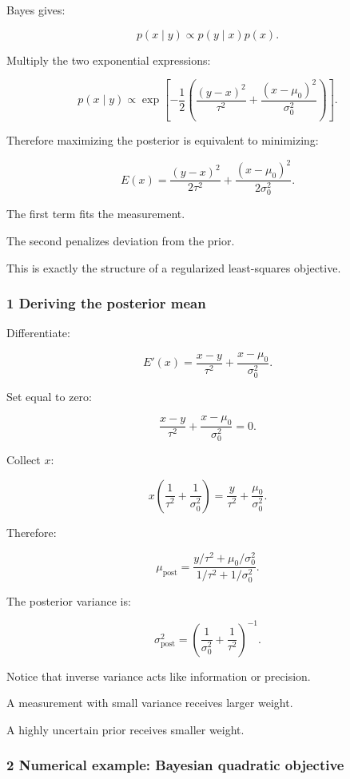 Bayes gives:

\[
 p(x\mid y)\propto p(y\mid x)p(x).
\]

Multiply the two exponential expressions:

\[
 p(x\mid y) \propto \exp\left[ -\frac12 \left( \frac{(y-x)^2}{\tau^2} + \frac{(x-\mu_0)^2}{\sigma_0^2} \right) \right].
\]

Therefore maximizing the posterior is equivalent to minimizing:

\[
 \boxed{ E(x)= \frac{(y-x)^2}{2\tau^2} + \frac{(x-\mu_0)^2}{2\sigma_0^2} }.
\]

The first term fits the measurement.

The second penalizes deviation from the prior.

This is exactly the structure of a regularized least-squares objective.

\subsubsection{1 Deriving the posterior mean}\label{02-foundations-ii-ch031-deriving-the-posterior-mean}

Differentiate:

\[
 E'(x)= \frac{x-y}{\tau^2} + \frac{x-\mu_0}{\sigma_0^2}.
\]

Set equal to zero:

\[
 \frac{x-y}{\tau^2} + \frac{x-\mu_0}{\sigma_0^2} =0.
\]

Collect \(x\):

\[
 x\left( \frac1{\tau^2} +\frac1{\sigma_0^2} \right) = \frac y{\tau^2} +\frac{\mu_0}{\sigma_0^2}.
\]

Therefore:

\[
 \boxed{ \mu_{\mathrm{post}} = \frac{ y/\tau^2+\mu_0/\sigma_0^2 }{ 1/\tau^2+1/\sigma_0^2 } }.
\]

The posterior variance is:

\[
 \boxed{ \sigma_{\mathrm{post}}^2 = \left( \frac1{\sigma_0^2} +\frac1{\tau^2} \right)^{-1} }.
\]

Notice that inverse variance acts like information or precision.

A measurement with small variance receives larger weight.

A highly uncertain prior receives smaller weight.

\subsubsection{2 Numerical example: Bayesian quadratic objective}\label{02-foundations-ii-ch031-numerical-example-bayesian-quadratic-objective}

